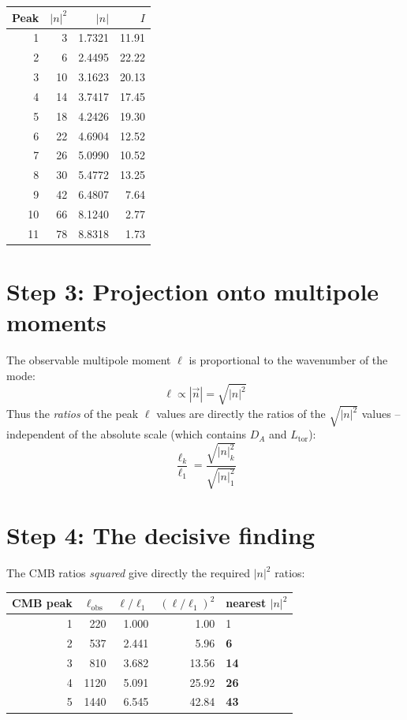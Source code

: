\begin{center}
\begin{tabular}{rrrr}
\toprule
Peak & $|n|^2$ & $|n|$ & $I$ \\
\midrule
1 & 3  & 1{.}7321 & 11{.}91 \\
2 & 6  & 2{.}4495 & 22{.}22 \\
3 & 10 & 3{.}1623 & 20{.}13 \\
4 & 14 & 3{.}7417 & 17{.}45 \\
5 & 18 & 4{.}2426 & 19{.}30 \\
6 & 22 & 4{.}6904 & 12{.}52 \\
7 & 26 & 5{.}0990 & 10{.}52 \\
8 & 30 & 5{.}4772 & 13{.}25 \\
9 & 42 & 6{.}4807 & 7{.}64  \\
10 & 66 & 8{.}1240 & 2{.}77 \\
11 & 78 & 8{.}8318 & 1{.}73 \\
\bottomrule
\end{tabular}
\end{center}

\section{Step 3: Projection onto multipole moments}

The observable multipole moment $\ell$ is proportional to the
wavenumber of the mode:
\[
  \ell \propto |\vec{n}| = \sqrt{|n|^2}
\]
Thus the \emph{ratios} of the peak $\ell$ values are directly the
ratios of the $\sqrt{|n|^2}$ values -- independent of the absolute
scale (which contains $D_A$ and $L_\mathrm{tor}$):
\[
  \frac{\ell_k}{\ell_1} = \frac{\sqrt{|n|^2_k}}{\sqrt{|n|^2_1}}
\]

\section{Step 4: The decisive finding}

The CMB ratios \emph{squared} give directly the required
$|n|^2$ ratios:

\begin{center}
\begin{tabular}{rrrrl}
\toprule
CMB peak & $\ell_\mathrm{obs}$ & $\ell/\ell_1$ & $(\ell/\ell_1)^2$ & nearest $|n|^2$ \\
\midrule
1 & 220  & 1{.}000 & 1{.}00  & 1 \\
2 & 537  & 2{.}441 & 5{.}96  & \textbf{6} \\
3 & 810  & 3{.}682 & 13{.}56 & \textbf{14} \\
4 & 1120 & 5{.}091 & 25{.}92 & \textbf{26} \\
5 & 1440 & 6{.}545 & 42{.}84 & \textbf{43} \\
\bottomrule
\end{tabular}
\end{center}

